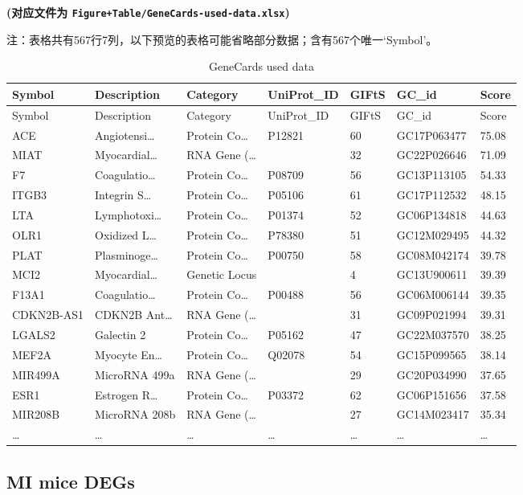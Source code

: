\documentclass[
]{article}
\begin{document}
\textbf{(对应文件为 \texttt{Figure+Table/GeneCards-used-data.xlsx})}

\begin{center}\begin{tcolorbox}[colback=gray!10, colframe=gray!50, width=0.9\linewidth, arc=1mm, boxrule=0.5pt]注：表格共有567行7列，以下预览的表格可能省略部分数据；含有567个唯一`Symbol'。
\end{tcolorbox}
\end{center}

\begin{longtable}[]{@{}lllllll@{}}
\caption{\label{tab:GeneCards-used-data}GeneCards used data}\tabularnewline
\toprule
Symbol & Description & Category & UniProt\_ID & GIFtS & GC\_id & Score\tabularnewline
\midrule
\endfirsthead
\toprule
Symbol & Description & Category & UniProt\_ID & GIFtS & GC\_id & Score\tabularnewline
\midrule
\endhead
ACE & Angiotensi\ldots{} & Protein Co\ldots{} & P12821 & 60 & GC17P063477 & 75.08\tabularnewline
MIAT & Myocardial\ldots{} & RNA Gene (\ldots{} & & 32 & GC22P026646 & 71.09\tabularnewline
F7 & Coagulatio\ldots{} & Protein Co\ldots{} & P08709 & 56 & GC13P113105 & 54.33\tabularnewline
ITGB3 & Integrin S\ldots{} & Protein Co\ldots{} & P05106 & 61 & GC17P112532 & 48.15\tabularnewline
LTA & Lymphotoxi\ldots{} & Protein Co\ldots{} & P01374 & 52 & GC06P134818 & 44.63\tabularnewline
OLR1 & Oxidized L\ldots{} & Protein Co\ldots{} & P78380 & 51 & GC12M029495 & 44.32\tabularnewline
PLAT & Plasminoge\ldots{} & Protein Co\ldots{} & P00750 & 58 & GC08M042174 & 39.78\tabularnewline
MCI2 & Myocardial\ldots{} & Genetic Locus & & 4 & GC13U900611 & 39.39\tabularnewline
F13A1 & Coagulatio\ldots{} & Protein Co\ldots{} & P00488 & 56 & GC06M006144 & 39.35\tabularnewline
CDKN2B-AS1 & CDKN2B Ant\ldots{} & RNA Gene (\ldots{} & & 31 & GC09P021994 & 39.31\tabularnewline
LGALS2 & Galectin 2 & Protein Co\ldots{} & P05162 & 47 & GC22M037570 & 38.25\tabularnewline
MEF2A & Myocyte En\ldots{} & Protein Co\ldots{} & Q02078 & 54 & GC15P099565 & 38.14\tabularnewline
MIR499A & MicroRNA 499a & RNA Gene (\ldots{} & & 29 & GC20P034990 & 37.65\tabularnewline
ESR1 & Estrogen R\ldots{} & Protein Co\ldots{} & P03372 & 62 & GC06P151656 & 37.58\tabularnewline
MIR208B & MicroRNA 208b & RNA Gene (\ldots{} & & 27 & GC14M023417 & 35.34\tabularnewline
\ldots{} & \ldots{} & \ldots{} & \ldots{} & \ldots{} & \ldots{} & \ldots{}\tabularnewline
\bottomrule
\end{longtable}

\hypertarget{MI}{%
\subsection{MI mice DEGs}\label{MI}}
\end{document}
